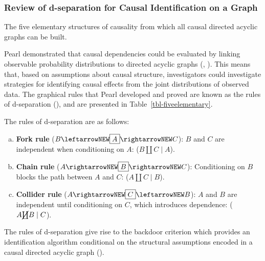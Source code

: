 \documentclass[
  single column]{article}
\begin{document}
\subsubsection{Review of d-separation for Causal Identification on a
Graph}\label{review-of-d-separation-for-causal-identification-on-a-graph}

\begin{table}

\caption{\label{tbl-fiveelementary}The five elementary structures of
causality from which all causal directed acyclic graphs can be built.}

\centering{

\terminologydirectedgraph

}

\end{table}%

Pearl demonstrated that causal dependencies could be evaluated by
linking observable probability distributions to directed acyclic graphs
(,
). This means that, based on assumptions
about causal structure, investigators could investigate strategies for
identifying causal effects from the joint distributions of observed
data. The graphical rules that Pearl developed and proved are known as
the rules of d-separation (), and
are presented in Table~\ref{tbl-fiveelementary}.

The rules of d-separation are as follows:

\begin{enumerate}[a)]
     \item {\bf Fork rule} ($B \leftarrowNEW \boxed{A} \rightarrowNEW C$): $B$ and $C$ are independent when conditioning on $A$: ($B \coprod C \mid A$).
     \item {\bf Chain rule} ($A \rightarrowNEW \boxed{B} \rightarrowNEW C$): Conditioning on $B$ blocks the path between $A$ and $C$: ($A \coprod C \mid B$).
     \item {\bf Collider rule} ($A \rightarrowNEW \boxed{C} \leftarrowNEW B$): $A$ and $B$ are independent until conditioning on $C$, which introduces dependence: ($A \cancel{\coprod} B \mid C$). 
\end{enumerate}

The rules of d-separation give rise to the backdoor criterion which
provides an identification algorithm conditional on the structural
assumptions encoded in a causal directed acyclic graph
().
\end{document}
